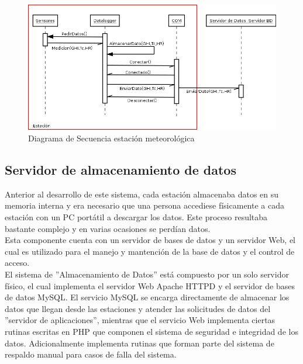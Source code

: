 \begin{figure}[h!]
        \centering
        \includegraphics[scale=0.5]{images/estacionSecuencia}
        \caption{Diagrama de Secuencia estación meteorológica}
        \label{despliegue}
\end{figure}

\subsection{Servidor de almacenamiento de datos}
Anterior al desarrollo de este sistema, cada estación almacenaba datos en su memoria interna y era necesario que una persona accediese físicamente a cada estación con un PC portátil a descargar los datos. Este proceso resultaba bastante complejo y en varias ocasiones se perdían datos.\\ Esta componente cuenta con un servidor de bases de datos y un servidor Web, el cual es utilizado para el manejo y mantención de la base de datos y el control de acceso.\\

El sistema de ''Almacenamiento de Datos'' está compuesto por un solo servidor físico, el cual implementa el servidor Web Apache HTTPD y el servidor de bases de datos MySQL. El servicio MySQL se encarga directamente de almacenar los datos que llegan desde las estaciones y atender las solicitudes de datos del ''servidor de aplicaciones'', mientras que el servicio Web implementa ciertas rutinas escritas en PHP que componen el sistema de seguridad e integridad de los datos. Adicionalmente implementa rutinas que forman parte del sistema de respaldo manual para casos de falla del sistema.\\


